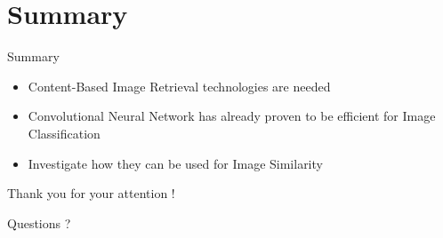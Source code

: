 \documentclass{beamer}
\begin{document}
\section*{Summary}

\begin{frame}{Summary}

  \begin{itemize}
    \setlength\itemsep{1em}
  \item
    Content-Based Image Retrieval technologies are needed
  \item
    Convolutional Neural Network has already proven to be efficient for Image Classification
  \item
    Investigate how they can be used for Image Similarity
  \end{itemize}

\end{frame}

\begin{frame}
  \begin{center}
  Thank you for your attention !
\end{center}

\begin{center}
  Questions ?
\end{center}
\end{frame}
\end{document}
